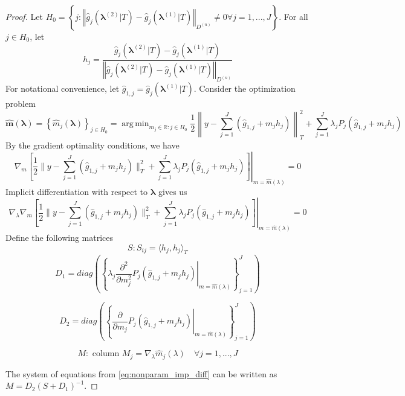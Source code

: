 \documentclass[12pt]{article}
\DeclareMathOperator*{\argmin}{arg\,min}
\begin{document}
\begin{proof}
	Let $H_{0} = \left \{
	j:\left\Vert \hat{g}_{j}(\boldsymbol{\lambda}^{(2)}|T)-\hat{g}_{j}(\boldsymbol{\lambda}^{(1)}|T)\right\Vert _{D^{(n)}} \ne 0 \forall j = 1,...,J
	\right \}$.
	For all $j \in H_0$, let 
	\[
	h_{j}=
	\frac{\hat{g}_{j}(\boldsymbol{\lambda}^{(2)}|T)-\hat{g}_{j}(\boldsymbol{\lambda}^{(1)}|T)}{\left\Vert \hat{g}_{j}(\boldsymbol{\lambda}^{(2)}|T)-\hat{g}_{j}(\boldsymbol{\lambda}^{(1)}|T)\right\Vert _{D^{(n)}}}
	\]
	For notational convenience, let $\hat{g}_{1,j} = \hat{g}_{j}(\boldsymbol{\lambda}^{(1)}|T)$. Consider the optimization problem
	\begin{equation}
	\hat{\boldsymbol{m}}(\boldsymbol{\lambda})=\left\{ \hat{m}_{j}(\boldsymbol{\lambda})\right\} _{j\in H_0}
	=\argmin_{m_{j} \in \mathbb{R}: j\in H_0}
	\frac{1}{2}
	\left \|y-\sum_{j=1}^{J}\left(\hat{g}_{1,j}+m_{j}h_{j}\right) \right \|_{T}^{2}
	+\sum_{j=1}^{J}\lambda_{j}
	P_{j} \left (\hat{g}_{1,j}+m_{j}h_{j} \right )
	\end{equation}
	By the gradient optimality conditions, we have
	\begin{equation}
		\nabla_{m} \left .
		\left[\frac{1}{2}\|y-\sum_{j=1}^{J}\left(\hat{g}_{1,j}+m_{j}h_{j}\right)\|_{T}^{2}+\sum_{j=1}^{J}\lambda_{j}P_{j}(\hat{g}_{1,j}+m_{j}h_{j})\right] \right |_{m=\hat{m}(\lambda)}
		= 0
		\label{eq:nonparam_grad_opt}
	\end{equation}
	Implicit differentiation with respect to $\boldsymbol{\lambda}$ gives us
	\begin{equation}
		\nabla_\lambda 
		\nabla_m
		\left . \left[
		\frac{1}{2}\|y-\sum_{j=1}^{J}\left(\hat{g}_{1,j}+m_{j}h_{j}\right)\|_{T}^{2}+\sum_{j=1}^{J}\lambda_{j}P_{j}(\hat{g}_{1,j}+m_{j}h_{j})\right] \right |_{m=\hat{m}(\lambda)}
		= 0
		\label{eq:nonparam_imp_diff}
	\end{equation}
	Define the following matrices
	\[
	S:S_{ij}=\langle h_{j},h_{j}\rangle_{T}
	\]
	\[
	D_{1}=diag\left(
	\left \{
	\left.\lambda_{j}\frac{\partial^{2}}{\partial m_{j}^{2}}P_{j}(\hat{g}_{1,j}+m_{j}h_{j})\right|_{m=\hat{m}(\lambda)}
	\right \}_{j=1}^J
	\right)
	\]
	
	
	\[
	D_{2}=diag\left(\left \{ \left.
	\frac{\partial}{\partial m_{j}}P_{j}(\hat{g}_{1,j}+m_{j}h_{j})\right|_{m=\hat{m}(\lambda)}
	\right \}_{j=1}^J
	\right)
	\]
	
	
	\[
	M:\mbox{ column }M_{j}=\nabla_{\lambda}\hat{m}_{j}(\lambda) \quad \forall j=1,...,J
	\]
	
	
	The system of equations from \eqref{eq:nonparam_imp_diff} can be written as  $M=D_{2}\left(S+D_{1}\right)^{-1}$.
	

\end{proof}
\end{document}
